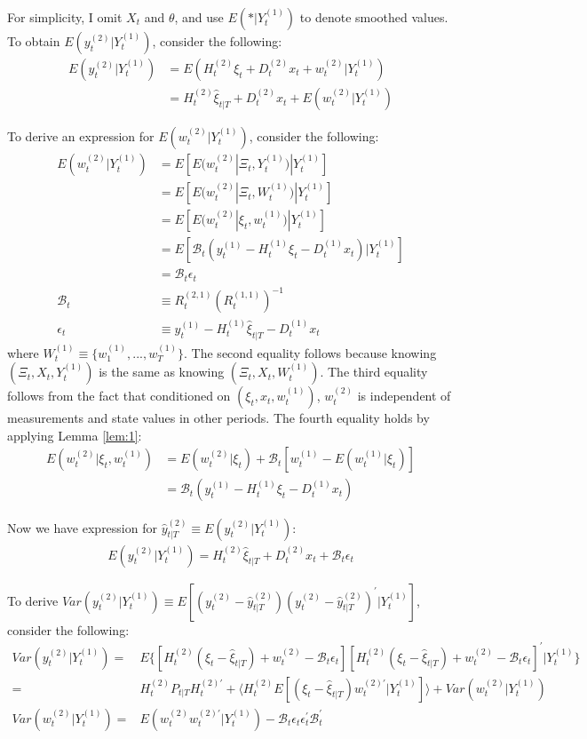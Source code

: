 \documentclass[10pt, titlepage]{article}
\numberwithin{equation}{section}
\begin{document}
For simplicity, I omit $X_t$ and $\theta$, and use $E(*|Y_t^{(1)})$ to denote smoothed values. To obtain $E(y_t^{(2)}|Y_t^{(1)})$, consider the following:
\begin{align*}
    E(y_t^{(2)}|Y_t^{(1)}) &= E(H_t^{(2)}\xi_t + D_t^{(2)}x_t + w_t^{(2)}|Y_t^{(1)}) \\
    &= H_t^{(2)}\hat{\xi}_{t|T} + D_t^{(2)}x_t + E(w_t^{(2)}|Y_t^{(1)})
\end{align*}

To derive an expression for $E(w_t^{(2)}|Y_t^{(1)})$, consider the following:
\begin{align*}
    E(w_t^{(2)}|Y_t^{(1)}) &= E[E(w_t^{(2)}|\Xi_t,Y_t^{(1)})|Y_t^{(1)}] \\
    &= E[E(w_t^{(2)}|\Xi_t, W_t^{(1)})|Y_t^{(1)}] \\
    &= E[E(w_t^{(2)}|\xi_t, w_t^{(1)})|Y_t^{(1)}] \\
    &= E[\mathcal{B}_t(y_t^{(1)} - H_t^{(1)}\xi_t - D_t^{(1)}x_t)|Y_t^{(1)}] \\
    &= \mathcal{B}_t\epsilon_t \\
    \mathcal{B}_t &\equiv R_t^{(2, 1)}\left(R_t^{(1, 1)}\right)^{-1} \\
    \epsilon_t &\equiv y_t^{(1)} - H_t^{(1)}\hat{\xi}_{t|T} - D_t^{(1)}x_t
\end{align*}
where $W_t^{(1)}\equiv \{w_1^{(1)},...,w_T^{(1)}\}$. The second equality follows because knowing $(\Xi_t, X_t, Y_t^{(1)})$ is the same as knowing $(\Xi_t, X_t, W_t^{(1)})$. The third equality follows from the fact that conditioned on $(\xi_t, x_t, w_t^{(1)})$, $w_t^{(2)}$ is independent of measurements and state values in other periods. The fourth equality holds by applying Lemma \ref{lem:1}:
\begin{align*}
    E(w_t^{(2)}|\xi_t, w_t^{(1)}) &= E(w_t^{(2)}|\xi_t) + \mathcal{B}_t[w_t^{(1)} - E(w_t^{(1)}|\xi_t)] \\
    &= \mathcal{B}_t(y_t^{(1)} - H_t^{(1)}\xi_t - D_t^{(1)}x_t)
\end{align*}

Now we have expression for $\hat{y}_{t|T}^{(2)} \equiv E(y_t^{(2)}|Y_t^{(1)})$:
\begin{align}
    E(y_t^{(2)}|Y_t^{(1)}) = H_t^{(2)}\hat{\xi}_{t|T} + D_t^{(2)}x_t + \mathcal{B}_t\epsilon_t
\end{align}

To derive $Var(y_t^{(2)}|Y_t^{(1)})\equiv E[(y_t^{(2)}-\hat{y}_{t|T}^{(2)})(y_t^{(2)}-\hat{y}_{t|T}^{(2)})^{'}|Y_t^{(1)}]$, consider the following:
\begin{align*}
    Var(y_t^{(2)}|Y_t^{(1)}) =& E\{[H_t^{(2)}(\xi_t - \hat{\xi}_{t|T}) + w_t^{(2)} - \mathcal{B}_t\epsilon_t]
        [H_t^{(2)}(\xi_t - \hat{\xi}_{t|T}) + w_t^{(2)} - \mathcal{B}_t\epsilon_t]^{'}|Y_t^{(1)}\} \\
    =& H_t^{(2)}P_{t|T}H_t^{(2)'} + \langle H_t^{(2)}E[(\xi_t - \hat{\xi}_{t|T})w_t^{(2)'}|Y_t^{(1)}]\rangle 
        + Var(w_t^{(2)}|Y_t^{(1)}) \\
    Var(w_t^{(2)}|Y_t^{(1)}) =& E(w_t^{(2)}w_t^{(2)'}|Y_t^{(1)}) - \mathcal{B}_t\epsilon_t\epsilon_t^{'}\mathcal{B}_t^{'}
\end{align*}
\end{document}
